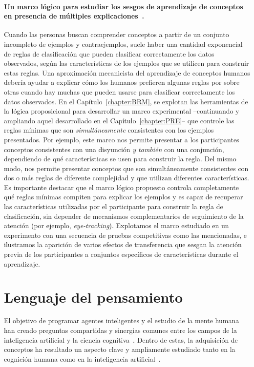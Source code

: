 \paragraph{Un marco lógico para estudiar los sesgos de aprendizaje de conceptos en presencia de múltiples explicaciones~\cite{tano2021framework}.}
Cuando las personas buscan comprender conceptos a partir de un conjunto incompleto de ejemplos y contraejemplos, suele haber una cantidad exponencial de reglas de clasificación que pueden clasificar correctamente los datos observados, según las características de los ejemplos que se utilicen para construir estas reglas. Una aproximación mecanicista del aprendizaje de conceptos humanos debería ayudar a explicar cómo los humanos prefieren algunas reglas por sobre otras cuando hay muchas que pueden usarse para clasificar correctamente los datos observados. En el Capítulo~\ref{chapter:BRM}, se explotan las herramientas de la lógica proposicional para desarrollar un marco experimental --continuando y ampliando aquel desarrollado en el Capítulo~\ref{chapter:PRE}-- que controle las reglas mínimas que son \textit{simultáneamente} consistentes con los ejemplos presentados. Por ejemplo, este marco nos permite presentar a los participantes conceptos consistentes con una disyunción \textit{y también} con una conjunción, dependiendo de qué características se usen para construir la regla. Del mismo modo, nos permite presentar conceptos que son simultáneamente consistentes con dos o más reglas de diferente complejidad y que utilizan diferentes características. Es importante destacar que el marco lógico propuesto controla completamente qué reglas mínimas compiten para explicar los ejemplos y es capaz de recuperar las características utilizadas por el participante para construir la regla de clasificación, sin depender de mecanismos complementarios de seguimiento de la atención (por ejemplo, {\em eye-tracking}). Explotamos el marco estudiado en un experimento con una secuencia de pruebas competitivas como las mencionadas, e ilustramos la aparición de varios efectos de transferencia que sesgan la atención previa de los participantes a conjuntos específicos de características durante el aprendizaje.


\section{Lenguaje del pensamiento}

El objetivo de programar agentes inteligentes y el estudio de la mente humana han creado preguntas compartidas y sinergias comunes entre los campos de la inteligencia artificial y la ciencia cognitiva~\cite{russell2002artificial}. Dentro de estas, la adquisición de conceptos ha resultado un aspecto clave y ampliamente estudiado tanto en la cognición humana como en la inteligencia artificial~\cite{cohen2005handbook, ashby2011human,tenenbaum2011grow}.

